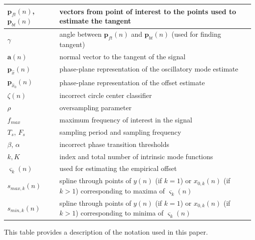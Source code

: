\documentclass[11pt,draftcls,onecolumn]{IEEEtran}
\begin{document}
\begin{table}[!ht]
\begin{tabular}{|l|l|}
	$\mathbf{p}_{ft}(n)$, $\mathbf{p}_{bt}(n)$ & vectors from point of interest to the points used to estimate the tangent \\ \hline	
	$\gamma$ & angle between $\mathbf{p}_{ft}(n)$ and $\mathbf{p}_{bt}(n)$ (used for finding tangent) \\ \hline
	$\mathbf{a}(n)$ & normal vector to the tangent of the signal \\ \hline
	$\mathbf{p}_{\hat{x}}(n)$ & phase-plane representation of the oscillatory mode estimate \\ \hline 
	$\mathbf{p}_{\hat{x}_0}(n)$ & phase-plane representation of the offset estimate \\ \hline  
	$\zeta(n)$ & incorrect circle center classifier \\ \hline
	$\rho$ & oversampling parameter \\ \hline
	$f_{max}$ & maximum frequency of interest in the signal \\ \hline
	$T_s$, $F_s$ & sampling period and sampling frequency \\ \hline
	$\beta$, $\alpha$ & incorrect phase transition thresholds \\ \hline 
	$k,K$ & index and total number of intrinsic mode functions \\ \hline
	$\varsigma_k(n)$ & used for estimating the empirical offset \\ \hline
	$s_{max,k}(n)$ & spline through points of $y(n)$ (if $k=1$) or $x_{0,k}(n)$ (if $k>1$) corresponding to maxima of $\varsigma_k(n)$ \\ \hline
	$s_{min,k}(n)$ & spline through points of $y(n)$ (if $k=1$) or $x_{0,k}(n)$ (if $k>1$) corresponding to minima of $\varsigma_k(n)$ \\ \hline
\end{tabular}
\begin{flushleft}This table provides a description of the notation used in this paper.
\end{flushleft}
\label{tab:Notation}
\end{table}
\end{document}
